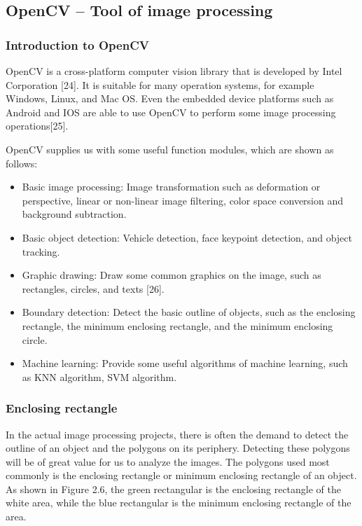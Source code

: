 \documentclass[22pt, UTF8]{article}
\numberwithin{figure}{section}
\numberwithin{table}{section}
\numberwithin{equation}{section} %
\begin{document}
\subsection{OpenCV -- Tool of image processing}

\subsubsection{Introduction to OpenCV}

\setlength\parindent{2em} OpenCV is a cross-platform computer vision library that is developed by Intel Corporation [24]. It is suitable for many operation systems, for example Windows, Linux, and Mac OS. Even the embedded device platforms such as Android and IOS are able to use OpenCV to perform some image processing operations[25].

\setlength\parindent{2em} OpenCV supplies us with some useful function modules, which are shown as follows:

\begin{itemize}
\item Basic image processing: Image transformation such as deformation or perspective, linear or non-linear image filtering, color space conversion and background subtraction.

\item Basic object detection: Vehicle detection, face keypoint detection, and object tracking.

\item Graphic drawing: Draw some common graphics on the image, such as rectangles, circles, and texts [26].

\item Boundary detection: Detect the basic outline of objects, such as the enclosing rectangle, the minimum enclosing rectangle, and the minimum enclosing circle.

\item Machine learning: Provide some useful algorithms of machine learning, such as KNN algorithm, SVM algorithm.
\end{itemize}

\subsubsection{Enclosing rectangle}

\setlength\parindent{2em} In the actual image processing projects, there is often the demand to detect the outline of an object and the polygons on its periphery. Detecting these polygons will be of great value for us to analyze the images. The polygons used most commonly is the enclosing rectangle or minimum enclosing rectangle of an object. As shown in Figure 2.6, the green rectangular is the enclosing rectangle of the white area, while the blue rectangular is the minimum enclosing rectangle of the area.
\end{document}
